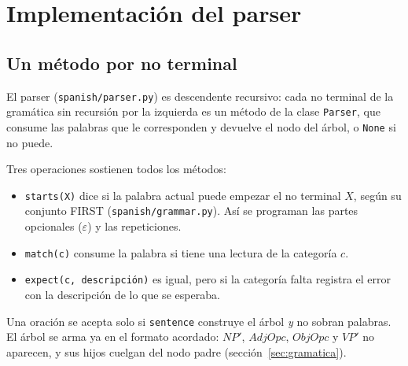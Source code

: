 \section{Implementación del parser}
\label{sec:parser}

\subsection{Un método por no terminal}

El parser (\texttt{spanish/parser.py}) es descendente recursivo: cada no terminal de la
gramática sin recursión por la izquierda es un método de la clase \texttt{Parser}, que consume
las palabras que le corresponden y devuelve el nodo del árbol, o \texttt{None} si no puede.

\begin{table}[h]
  \centering
  \small
  \caption{Correspondencia entre la gramática y el código.}
  \label{tab:metodos_parser}
\end{table}

Tres operaciones sostienen todos los métodos:
\begin{itemize}
  \item \texttt{starts(X)} dice si la palabra actual puede empezar el no terminal $X$, según su
    conjunto FIRST (\texttt{spanish/grammar.py}). Así se programan las partes opcionales
    ($\varepsilon$) y las repeticiones.
  \item \texttt{match(c)} consume la palabra si tiene una lectura de la categoría $c$.
  \item \texttt{expect(c, descripción)} es igual, pero si la categoría falta registra el error
    con la descripción de lo que se esperaba.
\end{itemize}
Una oración se acepta solo si \texttt{sentence} construye el árbol \emph{y} no sobran palabras.
El árbol se arma ya en el formato acordado: $NP'$, $AdjOpc$, $ObjOpc$ y $VP'$ no aparecen, y sus
hijos cuelgan del nodo padre (sección~\ref{sec:gramatica}).

